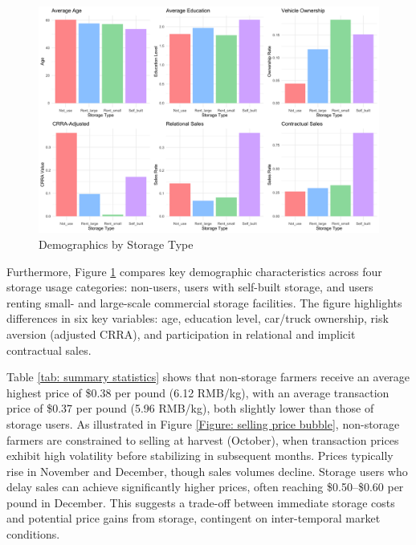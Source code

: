 \begin{figure}[htp]
\centering
\includegraphics[width=1\textwidth]{figures/combined_storage_metrics.png}
\caption{Demographics by Storage Type}
\label{Figure: Demographics by Storage Type}
\end{figure}

Furthermore, Figure \ref{Figure: Demographics by Storage Type} compares key demographic characteristics across four storage usage categories: non-users, users with self-built storage, and users renting small- and large-scale commercial storage facilities. The figure highlights differences in six key variables: age, education level, car/truck ownership, risk aversion (adjusted CRRA), and participation in relational and implicit contractual sales.  

Table \ref{tab: summary statistics} shows that non-storage farmers receive an average highest price of \$0.38 per pound (6.12 RMB/kg), with an average transaction price of \$0.37 per pound (5.96 RMB/kg), both slightly lower than those of storage users. As illustrated in Figure \ref{Figure: selling price bubble}, non-storage farmers are constrained to selling at harvest (October), when transaction prices exhibit high volatility before stabilizing in subsequent months. Prices typically rise in November and December, though sales volumes decline. Storage users who delay sales can achieve significantly higher prices, often reaching \$0.50–\$0.60 per pound in December. This suggests a trade-off between immediate storage costs and potential price gains from storage, contingent on inter-temporal market conditions.  

